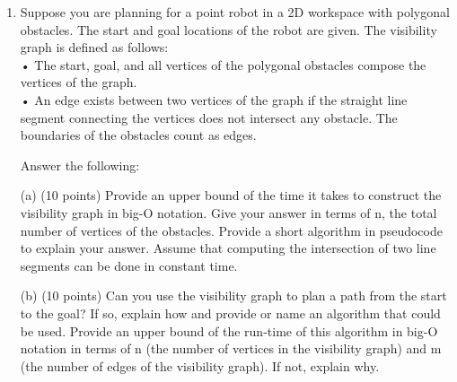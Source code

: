 \documentclass[a4 paper]{article}
\begin{document}
\begin{enumerate}

    \item Suppose you are planning for a point robot in a 2D workspace with polygonal obstacles. The start and goal locations of the robot are given. The visibility graph is defined as follows: \\
    • The start, goal, and all vertices of the polygonal obstacles compose the vertices of the graph.\\
    • An edge exists between two vertices of the graph if the straight line segment connecting the vertices does not intersect any obstacle. The boundaries of the obstacles count as edges.
    
    Answer the following:
    
    (a) (10 points) Provide an upper bound of the time it takes to construct the visibility graph in big-O notation. Give your answer in terms of n, the total number of vertices of the obstacles. Provide a short algorithm in pseudocode to explain your answer. Assume that computing the intersection of two line segments can be done in constant time.
    
    (b) (10 points) Can you use the visibility graph to plan a path from the start to the goal? If so, explain how and provide or name an algorithm that could be used. Provide an upper bound of the run-time of this algorithm in big-O notation in terms of n (the number of vertices in the visibility graph) and m (the number of edges of the visibility graph). If not, explain why.


\end{enumerate}
\end{document}
